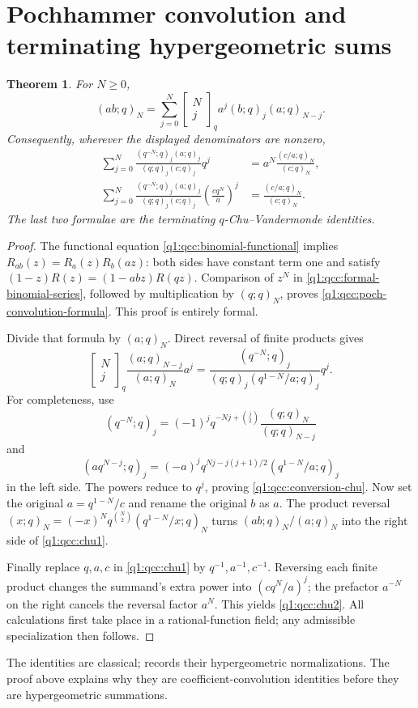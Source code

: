 \documentclass[11pt,a4paper,oneside,openany]{book}
\newtheorem{theorem}{Theorem}[chapter]
\theoremstyle{definition}
\theoremstyle{remark}
\newcommand{\GB}[3][q]{\begin{bmatrix}#2\\#3\end{bmatrix}_{#1}}
\begin{document}
\section{Pochhammer convolution and terminating hypergeometric sums}
\begin{theorem}\label{q1:qcc:poch-convolution}
For \(N\ge0\),
\begin{equation}\label{q1:qcc:poch-convolution-formula}
 (ab;q)_N=\sum_{j=0}^N\GB Nj a^j(b;q)_j(a;q)_{N-j}.
\end{equation}
Consequently, wherever the displayed denominators are nonzero,
\begin{align}
 \sum_{j=0}^N
 \frac{(q^{-N};q)_j(a;q)_j}{(q;q)_j(c;q)_j}q^j
 &=a^N\frac{(c/a;q)_N}{(c;q)_N},\label{q1:qcc:chu1}\\
 \sum_{j=0}^N
 \frac{(q^{-N};q)_j(a;q)_j}{(q;q)_j(c;q)_j}
 \left(\frac{cq^N}{a}\right)^j
 &=\frac{(c/a;q)_N}{(c;q)_N}.\label{q1:qcc:chu2}
\end{align}
The last two formulae are the terminating \(q\)-Chu--Vandermonde identities.
\end{theorem}
\begin{proof}
The functional equation \eqref{q1:qcc:binomial-functional} implies
\(R_{ab}(z)=R_a(z)R_b(az)\): both sides have constant term one and satisfy
\((1-z)R(z)=(1-abz)R(qz)\).
Comparison of \(z^N\) in \eqref{q1:qcc:formal-binomial-series}, followed by
multiplication by \((q;q)_N\), proves \eqref{q1:qcc:poch-convolution-formula}.
This proof is entirely formal.

Divide that formula by \((a;q)_N\). Direct reversal of finite products gives
\begin{equation}\label{q1:qcc:conversion-chu}
 \GB Nj\frac{(a;q)_{N-j}}{(a;q)_N}a^j
 =\frac{(q^{-N};q)_j}{(q;q)_j(q^{1-N}/a;q)_j}q^j.
\end{equation}
For completeness, use
\[
 (q^{-N};q)_j=(-1)^j q^{-Nj+\binom j2}\frac{(q;q)_N}{(q;q)_{N-j}}
\]
and
\[
 (aq^{N-j};q)_j=(-a)^j q^{Nj-j(j+1)/2}(q^{1-N}/a;q)_j
\]
in the left side. The powers reduce to \(q^j\), proving
\eqref{q1:qcc:conversion-chu}.
Now set the original \(a=q^{1-N}/c\) and rename the original \(b\) as \(a\).
The product reversal
\((x;q)_N=(-x)^Nq^{\binom N2}(q^{1-N}/x;q)_N\)
turns \((ab;q)_N/(a;q)_N\) into the right side of \eqref{q1:qcc:chu1}.

Finally replace \(q,a,c\) in \eqref{q1:qcc:chu1} by
\(q^{-1},a^{-1},c^{-1}\). Reversing each finite product changes the summand's
extra power into \((cq^N/a)^j\); the prefactor \(a^{-N}\) on the right cancels
the reversal factor \(a^N\). This yields \eqref{q1:qcc:chu2}.
All calculations first take place in a rational-function field; any admissible
specialization then follows.
\end{proof}
The identities are classical; \cite{dlmf176} records their hypergeometric
normalizations. The proof above explains why they are coefficient-convolution
identities before they are hypergeometric summations.
\end{document}

